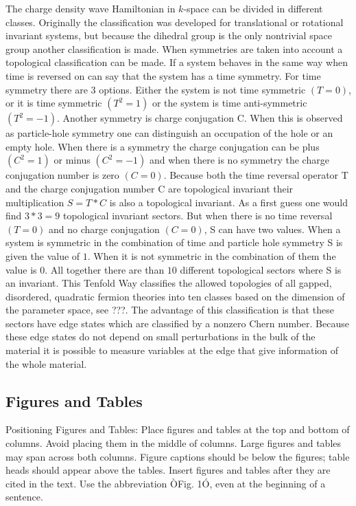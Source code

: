 \documentclass[letterpaper, 10 pt, conference]{ieeeconf}  %
\begin{document}
The charge density wave Hamiltonian in $k$-space can be divided in different
classes. Originally the classification was developed for translational or
rotational invariant systems, but because the dihedral group is the only
nontrivial space group another classification is made. When symmetries are taken
into account a topological classification can be made. If a system behaves in
the same way when time is reversed on can say that the system has a time
symmetry. For time symmetry there are 3 options. Either the system is not time
symmetric $(T=0)$, or it is time symmetric $(T^2=1)$ or the system is time
anti-symmetric  $(T^2=-1)$.  Another symmetry  is charge conjugation C. When
this is observed as particle-hole symmetry one can distinguish an occupation of
the hole or an empty hole. When there is a symmetry the  charge conjugation can
be plus $(C^2=1)$ or minus $(C^2=-1)$ and when there is no symmetry  the charge
conjugation number  is zero $(C=0)$.  Because both the time reversal operator T
and the charge conjugation number C are topological invariant their
multiplication $S=T * C $ is also a topological invariant. As a first guess one
would find $3 * 3 = 9 $ topological invariant sectors. But when there is no time
reversal $(T=0)$ and no charge conjugation $(C=0)$, S can have two values. When
a system is symmetric in the combination of time and particle hole symmetry S is
given the value of $1$. When it is not symmetric in the combination of them the
value is $0$. All together there are than $10$ different topological sectors
where S is an invariant. This Tenfold Way classifies the allowed topologies of
all gapped, disordered, quadratic fermion theories into ten classes based on the
dimension of the parameter space, see ???. The advantage of this classification is that
these sectors have edge states which are classified by a nonzero Chern number.
Because these edge states do not
depend on small perturbations in the bulk of the material it is possible to
measure variables at the edge that give information of the whole material.



\subsection{Figures and Tables}

Positioning Figures and Tables: Place figures and tables at the top and bottom of columns. Avoid placing them in the middle of columns. Large figures and tables may span across both columns. Figure captions should be below the figures; table heads should appear above the tables. Insert figures and tables after they are cited in the text. Use the abbreviation ÒFig. 1Ó, even at the beginning of a sentence.
\end{document}

